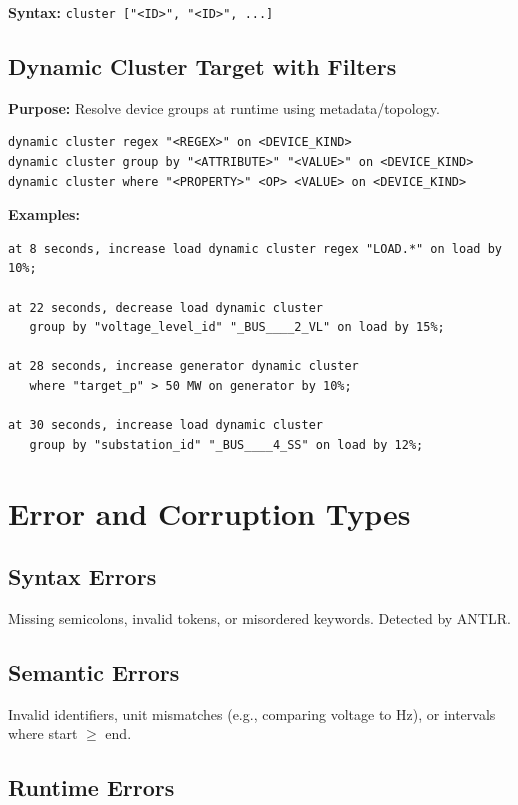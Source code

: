 \documentclass[12pt]{article}
\begin{document}
\textbf{Syntax:} \texttt{cluster ["<ID>", "<ID>", ...]}

\subsection{Dynamic Cluster Target with Filters}

\textbf{Purpose:} Resolve device groups at runtime using metadata/topology.

\begin{lstlisting}
dynamic cluster regex "<REGEX>" on <DEVICE_KIND>
dynamic cluster group by "<ATTRIBUTE>" "<VALUE>" on <DEVICE_KIND>
dynamic cluster where "<PROPERTY>" <OP> <VALUE> on <DEVICE_KIND>
\end{lstlisting}

\textbf{Examples:}
\begin{lstlisting}
at 8 seconds, increase load dynamic cluster regex "LOAD.*" on load by 10%;

at 22 seconds, decrease load dynamic cluster
   group by "voltage_level_id" "_BUS____2_VL" on load by 15%;

at 28 seconds, increase generator dynamic cluster
   where "target_p" > 50 MW on generator by 10%;

at 30 seconds, increase load dynamic cluster
   group by "substation_id" "_BUS____4_SS" on load by 12%;
\end{lstlisting}

\section{Error and Corruption Types}

\subsection{Syntax Errors}

Missing semicolons, invalid tokens, or misordered keywords. Detected by ANTLR.

\subsection{Semantic Errors}

Invalid identifiers, unit mismatches (e.g., comparing voltage to Hz), or intervals where start $\geq$ end.

\subsection{Runtime Errors}
\end{document}
